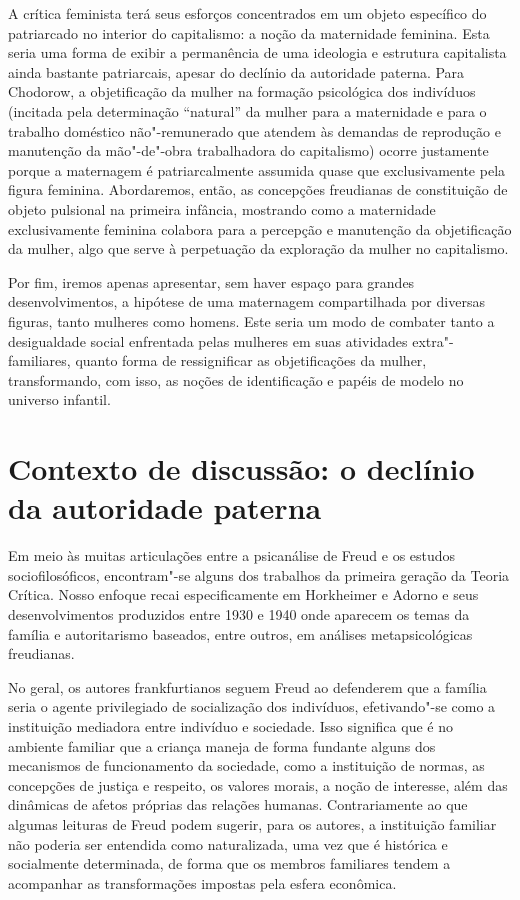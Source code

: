 A crítica feminista terá seus esforços concentrados em um objeto
específico do patriarcado no interior do capitalismo: a noção da
maternidade feminina. Esta seria uma forma de exibir a permanência de
uma ideologia e estrutura capitalista ainda bastante patriarcais, apesar
do declínio da autoridade paterna. Para Chodorow, a objetificação da
mulher na formação psicológica dos indivíduos (incitada pela
determinação ``natural'' da mulher para a maternidade e para o trabalho
doméstico não"-remunerado que atendem às demandas de reprodução e
manutenção da mão"-de"-obra trabalhadora do capitalismo) ocorre justamente
porque a maternagem é patriarcalmente assumida quase que exclusivamente
pela figura feminina. Abordaremos, então, as concepções freudianas de
constituição de objeto pulsional na primeira infância, mostrando como a
maternidade exclusivamente feminina colabora para a percepção e
manutenção da objetificação da mulher, algo que serve à perpetuação da
exploração da mulher no capitalismo.

Por fim, iremos apenas apresentar, sem haver espaço para grandes
desenvolvimentos, a hipótese de uma maternagem compartilhada por
diversas figuras, tanto mulheres como homens. Este seria um modo de
combater tanto a desigualdade social enfrentada pelas mulheres em suas
atividades extra"-familiares, quanto forma de ressignificar as
objetificações da mulher, transformando, com isso, as noções de
identificação e papéis de modelo no universo infantil.

\section{Contexto de discussão: o declínio da autoridade paterna }

Em meio às muitas articulações entre a psicanálise de Freud e os estudos
sociofilosóficos, encontram"-se alguns dos trabalhos da primeira geração
da Teoria Crítica. Nosso enfoque recai especificamente em Horkheimer e
Adorno e seus desenvolvimentos produzidos entre 1930 e 1940 onde
aparecem os temas da família e autoritarismo baseados, entre outros, em
análises metapsicológicas freudianas.

No geral, os autores frankfurtianos seguem Freud ao defenderem que a
família seria o agente privilegiado de socialização dos indivíduos,
efetivando"-se como a instituição mediadora entre indivíduo e sociedade.
Isso significa que é no ambiente familiar que a criança maneja de forma
fundante alguns dos mecanismos de funcionamento da sociedade, como a
instituição de normas, as concepções de justiça e respeito, os valores
morais, a noção de interesse, além das dinâmicas de afetos próprias das
relações humanas. Contrariamente ao que algumas leituras de Freud podem
sugerir, para os autores, a instituição familiar não poderia ser
entendida como naturalizada, uma vez que é histórica e socialmente
determinada, de forma que os membros familiares tendem a acompanhar as
transformações impostas pela esfera econômica.


